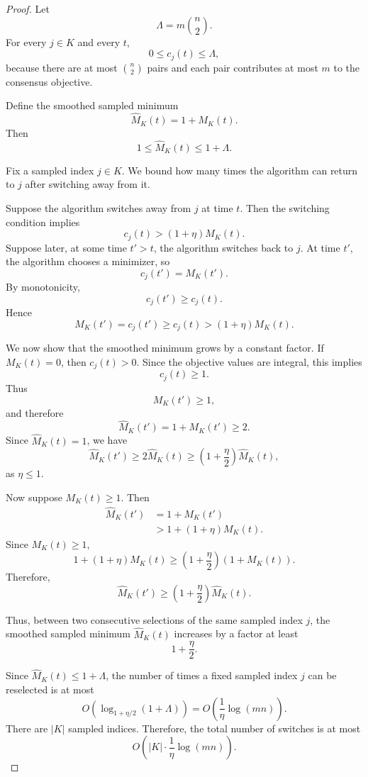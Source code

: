 \begin{proof}
Let
\[
    \Lambda=m\binom n2.
\]
For every \(j\in K\) and every \(t\),
\[
    0\le c_j(t)\le \Lambda,
\]
because there are at most \(\binom n2\) pairs and each pair contributes at most \(m\) to the consensus objective.

Define the smoothed sampled minimum
\[
    \widehat M_K(t)=1+M_K(t).
\]
Then
\[
    1\le \widehat M_K(t)\le 1+\Lambda.
\]

Fix a sampled index \(j\in K\). We bound how many times the algorithm can return to \(j\) after switching away from it.

Suppose the algorithm switches away from \(j\) at time \(t\). Then the switching condition implies
\[
    c_j(t)>(1+\eta)M_K(t).
\]
Suppose later, at some time \(t'>t\), the algorithm switches back to \(j\). At time \(t'\), the algorithm chooses a minimizer, so
\[
    c_j(t')=M_K(t').
\]
By monotonicity,
\[
    c_j(t')\ge c_j(t).
\]
Hence
\[
    M_K(t')=c_j(t')\ge c_j(t)>(1+\eta)M_K(t).
\]

We now show that the smoothed minimum grows by a constant factor. If \(M_K(t)=0\), then \(c_j(t)>0\). Since the objective values are integral, this implies
\[
    c_j(t)\ge 1.
\]
Thus
\[
    M_K(t')\ge 1,
\]
and therefore
\[
    \widehat M_K(t')=1+M_K(t')\ge 2.
\]
Since \(\widehat M_K(t)=1\), we have
\[
    \widehat M_K(t')\ge 2\widehat M_K(t)
    \ge
    \left(1+\frac{\eta}{2}\right)\widehat M_K(t),
\]
as \(\eta\le 1\).

Now suppose \(M_K(t)\ge 1\). Then
\[
\begin{aligned}
    \widehat M_K(t')
    &=1+M_K(t')\\
    &>1+(1+\eta)M_K(t).
\end{aligned}
\]
Since \(M_K(t)\ge 1\),
\[
    1+(1+\eta)M_K(t)
    \ge
    \left(1+\frac{\eta}{2}\right)(1+M_K(t)).
\]
Therefore,
\[
    \widehat M_K(t')
    \ge
    \left(1+\frac{\eta}{2}\right)\widehat M_K(t).
\]

Thus, between two consecutive selections of the same sampled index \(j\), the smoothed sampled minimum \(\widehat M_K(t)\) increases by a factor at least
\[
    1+\frac{\eta}{2}.
\]

Since \(\widehat M_K(t)\le 1+\Lambda\), the number of times a fixed sampled index \(j\) can be reselected is at most
\[
    O\left(
        \log_{1+\eta/2}(1+\Lambda)
    \right)
    =
    O\left(
        \frac{1}{\eta}\log(mn)
    \right).
\]
There are \(|K|\) sampled indices. Therefore, the total number of switches is at most
\[
    O\left(
        |K|\cdot \frac{1}{\eta}\log(mn)
    \right).
\]
\end{proof}

